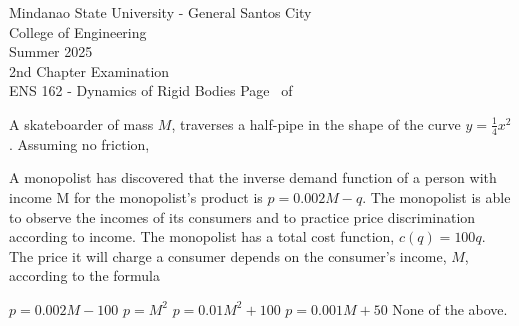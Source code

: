\documentclass[12pt,addpoints]{exam}
\begin{document}
\pagestyle{headandfoot} \extraheadheight{.25in} 
\firstpageheader{} {Mindanao State University - General Santos City\\ College of Engineering\\ Summer 2025 \\ 2nd Chapter Examination \\ ENS 162 - Dynamics of Rigid Bodies} {} 
\footer{} {Page \thepage\ of \numpages} {}



\begin{questions}


\question[15] A skateboarder of mass $M$, traverses a half-pipe in the shape of the curve $y=\frac{1}{4}x^2$. 
Assuming no friction,
	 

\myquestion[5] A monopolist has discovered that the inverse demand function of a
person with income M for the monopolist’s product is $p = 0.002M - q$. The
monopolist is able to observe the incomes of its consumers and to practice price
discrimination according to income.
 The monopolist has a total cost function, $c(q) = 100q$. The
price it will charge a consumer depends on the consumer's income, $M$, according
to the formula
	\begin{choices}
	\choice $p = 0.002M - 100$
	\choice $p = M^2$
	\choice $p = 0.01 M^2 + 100$
	\CorrectChoice $p = 0.001M + 50$
	\choice None of the above.
	\end{choices}


\end{questions}
\end{document}
